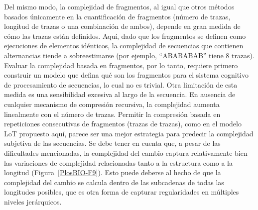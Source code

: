 
Del mismo modo, la complejidad de fragmentos, al igual que otros métodos basados únicamente en la cuantificación de fragmentos (número de trazas, longitud de trazas o una combinación de ambos), depende en gran medida de cómo las trazas están definidos. Aquí, dado que los fragmentos se definen como ejecuciones de elementos idénticos, la complejidad de secuencias que contienen alternancias tiende a sobreestimarse (por ejemplo, ``ABABABAB'' tiene 8 trazas). Evaluar la complejidad basada en fragmentos, por lo tanto, requiere primero construir un modelo que defina qué son los fragmentos para el sistema cognitivo de procesamiento de secuencias, lo cual no es trivial. Otra limitación de esta medida es una sensibilidad excesiva al largo de la secuencia. En ausencia de cualquier mecanismo de compresión recursiva, la complejidad aumenta linealmente con el número de trazas. Permitir la compresión basada en repeticiones consecutivas de fragmentos (trazas de trazas), como en el modelo LoT propuesto aquí, parece ser una mejor estrategia para predecir la complejidad subjetiva de las secuencias. Se debe tener en cuenta que, a pesar de las dificultades mencionadas, la complejidad del cambio captura relativamente bien las variaciones de complejidad relacionadas tanto a la estructura como a la longitud (Figura~\ref{PlosBIO-F9}). Esto puede deberse al hecho de que la complejidad del cambio se calcula dentro de las subcadenas de todas las longitudes posibles, que es otra forma de capturar regularidades en múltiples niveles jerárquicos.


